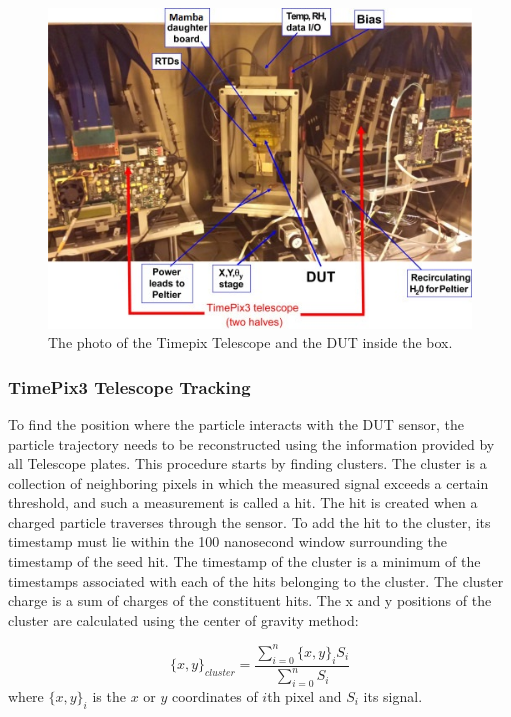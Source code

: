 \begin{figure}[!h]
\centering
\hspace*{-1cm}\includegraphics{figures/telescope_photo.jpg}
\caption{The photo of the Timepix Telescope and the DUT inside the box. }
\label{fig:telescope_photo}
\end{figure}

\subsubsection{TimePix3 Telescope Tracking}

To find the position where the particle interacts with the DUT sensor, the particle trajectory needs to be reconstructed using the information provided by all Telescope plates. This procedure starts by finding clusters. The cluster is a collection of neighboring pixels in which the measured signal exceeds a certain threshold, and such a measurement is called a hit. The hit is created when a charged particle traverses through the sensor.  To add the hit to the cluster, its timestamp must lie within the 100 nanosecond window surrounding the timestamp of the seed hit. The timestamp of the cluster is a minimum of the timestamps associated with each of the hits belonging to the cluster. The cluster charge is a sum of charges of the constituent hits. 
The x and y positions of the cluster are calculated using the center of gravity method: 

\begin{equation}
    \{x,y\}_{cluster} = \frac{\sum_{i = 0}^{n} \{x,y\}_{i} S_{i}}{\sum_{i = 0}^{n} S_{i}} 
\end{equation}
where $\{x,y\}_{i} $ is the $x$ or $y$  coordinates of $i$th pixel and $S_i$ its signal. 

